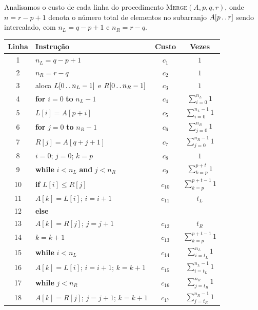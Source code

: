 \documentclass[9pt,a4paper]{extarticle}
\newcommand{\twodots}{\mathinner{\ldotp\ldotp}}
\begin{document}
Analisamos o custo de cada linha do procedimento \textsc{Merge}$(A, p, q, r)$, onde $n = r - p + 1$ denota o número total de elementos no subarranjo $A[p \twodots r]$ sendo intercalado, com $n_L = q - p + 1$ e $n_R = r - q$.

\begin{center}
\begin{tabular}{clcc}
\toprule
\textbf{Linha} & \textbf{Instrução} & \textbf{Custo} & \textbf{Vezes} \\
\midrule
1  & $n_L = q - p + 1$ & $c_1$ & $1$ \\
2  & $n_R = r - q$ & $c_2$ & $1$ \\
3  & aloca $L[0 \twodots n_L - 1]$ e $R[0 \twodots n_R - 1]$ & $c_3$ & $1$ \\
4  & \textbf{for} $i = 0$ \textbf{to} $n_L - 1$ & $c_4$ & $\displaystyle\sum_{i=0}^{n_L} 1$ \\
5  & \quad $L[i] = A[p + i]$ & $c_5$ & $\displaystyle\sum_{i=0}^{n_L - 1} 1$ \\
6  & \textbf{for} $j = 0$ \textbf{to} $n_R - 1$ & $c_6$ & $\displaystyle\sum_{j=0}^{n_R} 1$ \\
7  & \quad $R[j] = A[q + j + 1]$ & $c_7$ & $\displaystyle\sum_{j=0}^{n_R - 1} 1$ \\
8  & $i = 0$;\; $j = 0$;\; $k = p$ & $c_8$ & $1$ \\
9  & \textbf{while} $i < n_L$ \textbf{and} $j < n_R$ & $c_9$ & $\displaystyle\sum_{k=p}^{p+t} 1$ \\
10 & \quad \textbf{if} $L[i] \leq R[j]$ & $c_{10}$ & $\displaystyle\sum_{k=p}^{p+t-1} 1$ \\
11 & \quad\quad $A[k] = L[i]$;\; $i = i + 1$ & $c_{11}$ & $t_L$ \\
12 & \quad \textbf{else} & & \\
13 & \quad\quad $A[k] = R[j]$;\; $j = j + 1$ & $c_{12}$ & $t_R$ \\
14 & \quad $k = k + 1$ & $c_{13}$ & $\displaystyle\sum_{k=p}^{p+t-1} 1$ \\
15 & \textbf{while} $i < n_L$ & $c_{14}$ & $\displaystyle\sum_{i=t_L}^{n_L} 1$ \\
16 & \quad $A[k] = L[i]$;\; $i{=}i{+}1$;\; $k{=}k{+}1$ & $c_{15}$ & $\displaystyle\sum_{i=t_L}^{n_L - 1} 1$ \\
17 & \textbf{while} $j < n_R$ & $c_{16}$ & $\displaystyle\sum_{j=t_R}^{n_R} 1$ \\
18 & \quad $A[k] = R[j]$;\; $j{=}j{+}1$;\; $k{=}k{+}1$ & $c_{17}$ & $\displaystyle\sum_{j=t_R}^{n_R - 1} 1$ \\
\bottomrule
\end{tabular}
\end{center}
\end{document}
